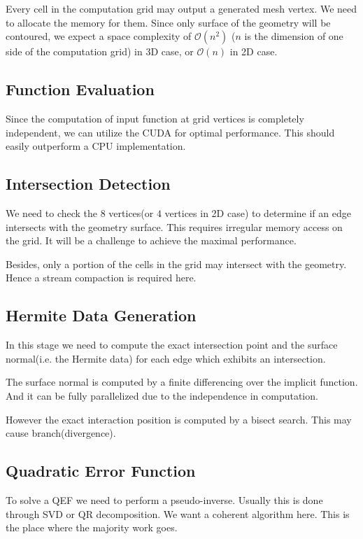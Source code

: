 \documentclass[a4paper,12pt]{article}
\begin{document}
Every cell in the computation grid may output a generated mesh vertex.
We need to allocate the memory for them.
Since only surface of the geometry will be contoured,
we expect a space complexity of $\mathcal{O}(n^2)$
($n$ is the dimension of one side of the computation grid) in 3D case,
or $\mathcal{O}(n)$ in 2D case.

\subsection{Function Evaluation}

Since the computation of input function at grid vertices
is completely independent,
we can utilize the CUDA for optimal performance.
This should easily outperform a CPU implementation.

\subsection{Intersection Detection}

We need to check the $8$ vertices(or $4$ vertices in 2D case)
to determine if an edge intersects with the geometry surface.
This requires irregular memory access on the grid.
It will be a challenge to achieve the maximal performance.

Besides, only a portion of the cells in the grid may intersect with
the geometry. Hence a stream compaction is required here.

\subsection{Hermite Data Generation}

In this stage we need to compute the
exact intersection point and the surface normal(i.e. the Hermite data)
for each edge which exhibits an intersection.

The surface normal is computed
by a finite differencing over the implicit function.
And it can be fully parallelized due to the independence in computation.

However the exact interaction position is computed by a bisect search.
This may cause branch(divergence).

\subsection{Quadratic Error Function}

To solve a QEF we need to perform a pseudo-inverse.
Usually this is done through SVD or QR decomposition.
We want a coherent algorithm here.
This is the place where the majority work goes.
\end{document}
